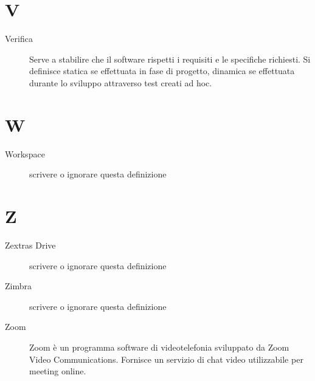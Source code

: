 \documentclass[a4paper, oneside]{article}
\begin{document}
\section{V}
\begin{description}
  \item[Verifica] Serve a stabilire che il software rispetti i requisiti e le specifiche richiesti. Si definisce statica se effettuata in fase di progetto, dinamica se effettuata durante lo sviluppo attraverso test creati ad hoc.
\end{description}
\newpage
\section{W}
\begin{description}
  \item[Workspace] {scrivere o ignorare questa definizione}
\end{description}
\newpage
\section{Z}
\begin{description}
  \item[Zextras Drive] {scrivere o ignorare questa definizione}
  \item[Zimbra] {scrivere o ignorare questa definizione}
  \item[Zoom] Zoom è un programma software di videotelefonia sviluppato da Zoom Video Communications. Fornisce un servizio di chat video utilizzabile per meeting online.
\end{description}
\newpage
\end{document}
